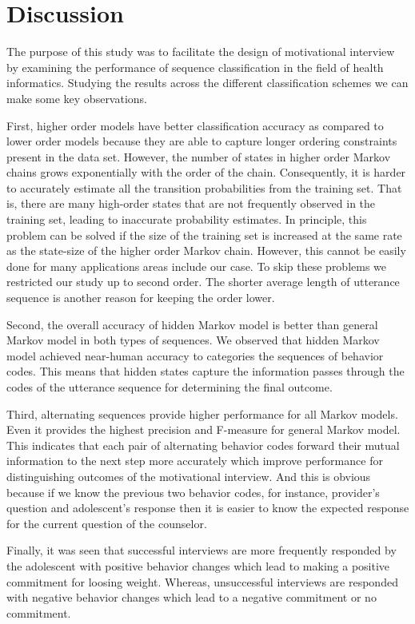 \documentclass{amia}
\begin{document}
\section*{Discussion}
The purpose of this study was to facilitate the design of motivational interview by examining the performance of sequence classification in the field of health informatics. Studying the results across the different classification schemes we can make some key observations. 

First, higher order models have better classification accuracy as compared to lower order models because they are able to capture longer ordering constraints present in the data set. However, the number of states in higher order Markov chains grows exponentially with the order of the chain. Consequently, it is harder to accurately estimate all the transition probabilities from the training set. That is, there are many high-order states that are not frequently observed in the training set, leading to inaccurate probability estimates. In principle, this problem can be solved if the size of the training set is increased at the same rate as the state-size of the higher order Markov chain. However, this cannot be easily done for many applications areas include our case. To skip these problems we restricted our study up to second order. The shorter average length of utterance sequence is another reason for keeping the order lower.  

Second, the overall accuracy of hidden Markov model is better than general Markov model in both types of sequences. We observed that hidden Markov model achieved near-human accuracy to categories the sequences of behavior codes. This means that hidden states capture the information passes through the codes of the utterance sequence for determining the final outcome. 

Third, alternating sequences provide higher performance for all Markov models. Even it provides the highest precision and F-measure for general Markov model. This indicates that each pair of alternating behavior codes forward their mutual information to the next step more accurately which improve performance for distinguishing outcomes of the motivational interview. And this is obvious because if we know the previous two behavior codes, for instance, provider's question and adolescent's response then it is easier to know the expected response for the current question of the counselor.   

Finally, it was seen that successful interviews are more frequently responded by the adolescent with positive behavior changes which lead to making a positive commitment for loosing weight. Whereas, unsuccessful interviews are responded with negative behavior changes which lead to a negative commitment or no commitment. 
\end{document}
